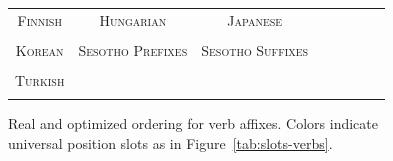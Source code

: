 \documentclass[11pt,letterpaper]{article}
\begin{document}
\begin{figure}[]

\begin{tabular}{cccccccc}
\textsc{Finnish} & \textsc{Hungarian} & \textsc{Japanese} \\
\begin{minipage}{.3\textwidth}
  
  \end{minipage}
  &
  \begin{minipage}{.3\textwidth}
  
  \end{minipage}
  &
    \begin{minipage}{.3\textwidth}
  
  \end{minipage}
  \\
  \textsc{Korean}  & \textsc{Sesotho Prefixes} &
  \textsc{Sesotho Suffixes} \\
      \begin{minipage}{.3\textwidth}
  
  \end{minipage}
  &
  \begin{minipage}{.3\textwidth}
  
  \end{minipage}
  &
  \begin{minipage}{.3\textwidth}
  
  \end{minipage} \\
  \textsc{Turkish} \\
  \begin{minipage}{.3\textwidth}
  
  \end{minipage}
  \end{tabular}
  
  
    \caption{Real and optimized ordering for verb affixes. Colors indicate universal position slots as in Figure~\ref{tab:slots-verbs}.
    }
    \label{fig:real_and_optimized_verbs}
\end{figure}
\end{document}

